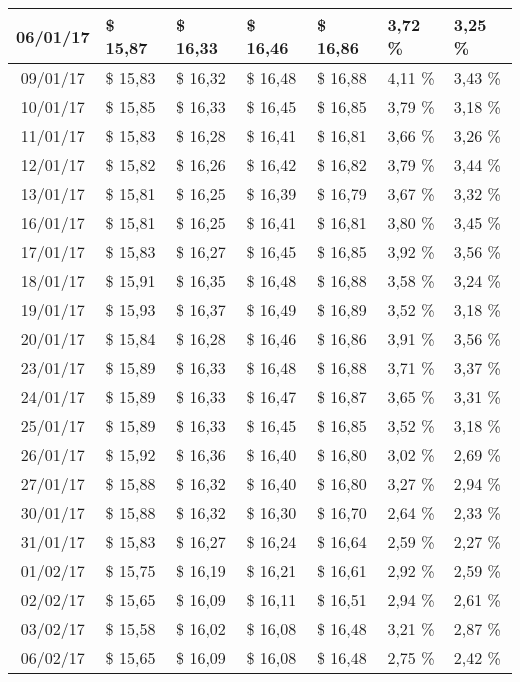 \begin{center}
\begin{longtable}{|c|p{1.5cm}|p{1.5cm}|p{1.5cm}|p{1.5cm}|p{1.5cm}|p{1.5cm}|}
06/01/17 & \$ 15,87 & \$ 16,33 & \$ 16,46 & \$ 16,86 & 3,72 \% & 3,25 \% \\ \hline
09/01/17 & \$ 15,83 & \$ 16,32 & \$ 16,48 & \$ 16,88 & 4,11 \% & 3,43 \% \\ \hline
10/01/17 & \$ 15,85 & \$ 16,33 & \$ 16,45 & \$ 16,85 & 3,79 \% & 3,18 \% \\ \hline
11/01/17 & \$ 15,83 & \$ 16,28 & \$ 16,41 & \$ 16,81 & 3,66 \% & 3,26 \% \\ \hline
12/01/17 & \$ 15,82 & \$ 16,26 & \$ 16,42 & \$ 16,82 & 3,79 \% & 3,44 \% \\ \hline
13/01/17 & \$ 15,81 & \$ 16,25 & \$ 16,39 & \$ 16,79 & 3,67 \% & 3,32 \% \\ \hline
16/01/17 & \$ 15,81 & \$ 16,25 & \$ 16,41 & \$ 16,81 & 3,80 \% & 3,45 \% \\ \hline
17/01/17 & \$ 15,83 & \$ 16,27 & \$ 16,45 & \$ 16,85 & 3,92 \% & 3,56 \% \\ \hline
18/01/17 & \$ 15,91 & \$ 16,35 & \$ 16,48 & \$ 16,88 & 3,58 \% & 3,24 \% \\ \hline
19/01/17 & \$ 15,93 & \$ 16,37 & \$ 16,49 & \$ 16,89 & 3,52 \% & 3,18 \% \\ \hline
20/01/17 & \$ 15,84 & \$ 16,28 & \$ 16,46 & \$ 16,86 & 3,91 \% & 3,56 \% \\ \hline
23/01/17 & \$ 15,89 & \$ 16,33 & \$ 16,48 & \$ 16,88 & 3,71 \% & 3,37 \% \\ \hline
24/01/17 & \$ 15,89 & \$ 16,33 & \$ 16,47 & \$ 16,87 & 3,65 \% & 3,31 \% \\ \hline
25/01/17 & \$ 15,89 & \$ 16,33 & \$ 16,45 & \$ 16,85 & 3,52 \% & 3,18 \% \\ \hline
26/01/17 & \$ 15,92 & \$ 16,36 & \$ 16,40 & \$ 16,80 & 3,02 \% & 2,69 \% \\ \hline
27/01/17 & \$ 15,88 & \$ 16,32 & \$ 16,40 & \$ 16,80 & 3,27 \% & 2,94 \% \\ \hline
30/01/17 & \$ 15,88 & \$ 16,32 & \$ 16,30 & \$ 16,70 & 2,64 \% & 2,33 \% \\ \hline
31/01/17 & \$ 15,83 & \$ 16,27 & \$ 16,24 & \$ 16,64 & 2,59 \% & 2,27 \% \\ \hline
01/02/17 & \$ 15,75 & \$ 16,19 & \$ 16,21 & \$ 16,61 & 2,92 \% & 2,59 \% \\ \hline
02/02/17 & \$ 15,65 & \$ 16,09 & \$ 16,11 & \$ 16,51 & 2,94 \% & 2,61 \% \\ \hline
03/02/17 & \$ 15,58 & \$ 16,02 & \$ 16,08 & \$ 16,48 & 3,21 \% & 2,87 \% \\ \hline
06/02/17 & \$ 15,65 & \$ 16,09 & \$ 16,08 & \$ 16,48 & 2,75 \% & 2,42 \% \\ \hline

\end{longtable}
\end{center}

